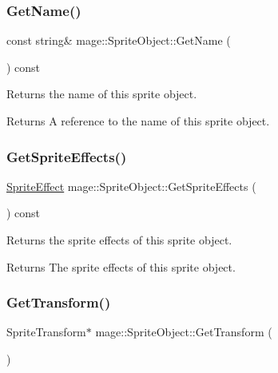 \hypertarget{classmage_1_1_sprite_object_aceda3826a222603d30e2d2b827f491bb}{}\label{classmage_1_1_sprite_object_aceda3826a222603d30e2d2b827f491bb} 
\subsubsection{\texorpdfstring{Get\+Name()}{GetName()}}
{\footnotesize\ttfamily const string\& mage\+::\+Sprite\+Object\+::\+Get\+Name (\begin{DoxyParamCaption}{ }\end{DoxyParamCaption}) const}

Returns the name of this sprite object.

\begin{DoxyReturn}{Returns}
A reference to the name of this sprite object. 
\end{DoxyReturn}
\hypertarget{classmage_1_1_sprite_object_af759fd1b68e2707b0f084da183e0b5f1}{}\label{classmage_1_1_sprite_object_af759fd1b68e2707b0f084da183e0b5f1} 
\subsubsection{\texorpdfstring{Get\+Sprite\+Effects()}{GetSpriteEffects()}}
{\footnotesize\ttfamily \hyperlink{namespacemage_a9cfe18123066ba4236f548f9de75d881}{Sprite\+Effect} mage\+::\+Sprite\+Object\+::\+Get\+Sprite\+Effects (\begin{DoxyParamCaption}{ }\end{DoxyParamCaption}) const}

Returns the sprite effects of this sprite object.

\begin{DoxyReturn}{Returns}
The sprite effects of this sprite object. 
\end{DoxyReturn}
\hypertarget{classmage_1_1_sprite_object_ab48dfd7c6833067d67634bc89d7cb99c}{}\label{classmage_1_1_sprite_object_ab48dfd7c6833067d67634bc89d7cb99c} 
\subsubsection{\texorpdfstring{Get\+Transform()}{GetTransform()}\hspace{0.1cm}{\footnotesize\ttfamily [1/2]}}
{\footnotesize\ttfamily Sprite\+Transform$\ast$ mage\+::\+Sprite\+Object\+::\+Get\+Transform (\begin{DoxyParamCaption}{ }\end{DoxyParamCaption})}

